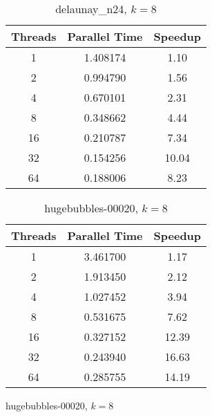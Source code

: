 \documentclass{article}
\begin{document}
\begin{figure}[H]
\begin{minipage}{0.45\textwidth}
\begin{table}[H]
\begin{center}
    \begin{tabular}{|c|c|c|}
        \hline
        Threads & Parallel Time & Speedup \\
        \hline
        1 & 1.408174 & 1.10 \\
        2 & 0.994790 & 1.56 \\
        4 & 0.670101 & 2.31 \\
        8 & 0.348662 & 4.44 \\
        16 & 0.210787 & 7.34 \\
        32 & 0.154256 & 10.04 \\
        64 & 0.188006 & 8.23 \\
        \hline
    \end{tabular}
\caption{delaunay\_n24, \(  k = 8 \)}
\end{center}
\end{table}
\end{minipage}
\begin{minipage}{0.45\textwidth}
\begin{table}[H]
\begin{center}
    \begin{tabular}{|c|c|c|}
        \hline
        Threads & Parallel Time & Speedup \\
        \hline
        1 & 3.461700 & 1.17 \\
        2 & 1.913450 & 2.12 \\
        4 & 1.027452 & 3.94 \\
        8 & 0.531675 & 7.62 \\
        16 & 0.327152 & 12.39 \\
        32 & 0.243940 & 16.63 \\
        64 & 0.285755 & 14.19 \\
        \hline
    \end{tabular}
\caption{hugebubbles-00020, \(  k = 8 \)}
\end{center}
\end{table}
\end{minipage}
\end{figure}


    \timetwo
\end{document}
